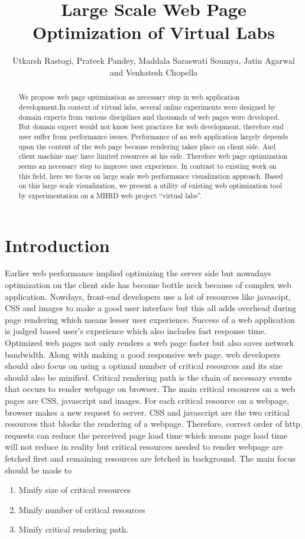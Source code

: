 \documentclass[a4paper,10pt]{IEEEtran}
\title{Large Scale Web Page Optimization of Virtual Labs}
\author{Utkarsh Rastogi, Prateek Pandey, Maddala Saraswati Soumya, Jatin Agarwal
and Venkatesh Chopella}
\begin{document}
\maketitle

\begin{abstract}
We propose web page optimization as necessary step in web application
development.In context of virtual labs, several online experiments were designed by domain
experts
from various disciplines and thousands of web pages were developed.
But domain expert would not know best practices for web development, therefore
end user suffer from performance issues.
Performance of an web application largely depends upon the content of the web
page because rendering takes place on client side. 
And client machine may have limited resources at his side. Therefore web page
optimization seems an necessary step to improve user experience.
In contrast to existing work on this field, here we focus on large scale web
performance visualization approach. Based on this large scale visualization,
we present a utility of existing web optimization tool by experimentation on a
MHRD web project ``virtual labs''.
\end{abstract}

\section{Introduction}\label{sec-2}
Earlier web performance implied optimizing the server side but nowadays
optimization on the client side has become bottle neck because of complex web
application. Nowdays, front-end developers use a lot of resources like
javascipt, CSS and images to make a good user interface but this all adds
overhead
during page rendering which means lesser user experience. Success of a web
application is judged based user's experience which also includes fast response
time.
Optimized web pages not only renders a web page faster but also saves network
bandwidth. Along with making a good responsive web page, web developers should
also focus on using a optimal number of critical resources and its size should
also be minified. Critical rendering path is the chain of necessary events that
occurs to render webpage on browser. The main critical resources on a web
pages are CSS, javascript and images. For each critical resource on a
webpage, browser makes a new request to server. CSS and javascript are the two
critical resources that blocks the rendering of a webpage. Therefore, correct
order of http requests can reduce the perceived page load time which means page
load time will not reduce in reality but critical resources needed to render webpage are
fetched first and remaining resources are fetched in background. The main focus
should be made to
\begin{enumerate}
 \item Minify size of critical resources
 \item Minify number of critical resources
 \item Minify critical rendering path.
\end{enumerate}
\end{document}
